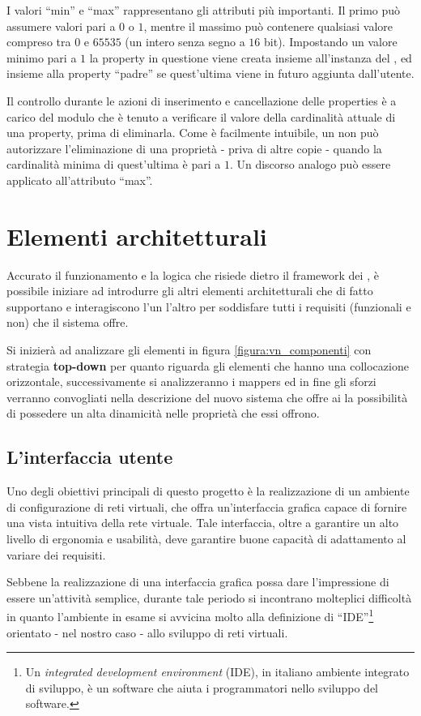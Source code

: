 I valori ``min'' e ``max'' rappresentano gli attributi più importanti. Il primo può assumere valori pari a $0$ o $1$, mentre il massimo può contenere qualsiasi valore compreso tra $0$ e $65535$ (un intero senza segno a $16$ bit). Impostando un valore minimo pari a $1$ la property in questione viene creata insieme all'instanza del \plugin{}, ed insieme alla property ``padre'' se quest'ultima viene in futuro aggiunta dall'utente.

Il controllo durante le azioni di inserimento e cancellazione delle properties è a carico del modulo che è tenuto a verificare il valore della cardinalità attuale di una property, prima di eliminarla. Come è facilmente intuibile, un \plugin{} non può autorizzare l'eliminazione di una proprietà - priva di altre copie - quando la cardinalità minima di quest'ultima è pari a $1$. Un discorso analogo può essere applicato all'attributo ``max''.

\section{Elementi architetturali}
Accurato il funzionamento e la logica che risiede dietro il framework dei \plugin{}, è possibile iniziare ad introdurre gli altri elementi architetturali che di fatto supportano e interagiscono l'un l'altro per soddisfare tutti i requisiti (funzionali e non) che il sistema offre.

Si inizierà ad analizzare gli elementi in figura \ref{figura:vn_componenti} con strategia \textbf{top-down} per quanto riguarda gli elementi che hanno una collocazione orizzontale, successivamente si analizzeranno i mappers ed in fine gli sforzi verranno convogliati nella descrizione del nuovo sistema che offre ai \plugin{} la possibilità di possedere un alta dinamicità nelle proprietà che essi offrono.

\subsection{L'interfaccia utente}
Uno degli obiettivi principali di questo progetto è la realizzazione di un ambiente di configurazione di reti virtuali, che offra un'interfaccia grafica capace di fornire una vista intuitiva della rete virtuale.
Tale interfaccia, oltre a garantire un alto livello di ergonomia e usabilità, deve garantire buone capacità di adattamento al variare dei requisiti.

Sebbene la realizzazione di una interfaccia grafica possa dare l'impressione di essere un'attività semplice, durante tale periodo si incontrano molteplici difficoltà in quanto l'ambiente in esame si avvicina molto alla definizione di ``IDE''\footnote{Un \textit{integrated development environment} (IDE), in italiano ambiente integrato di sviluppo, è un software che aiuta i programmatori nello sviluppo del software.} orientato - nel nostro caso - allo sviluppo di reti virtuali.

